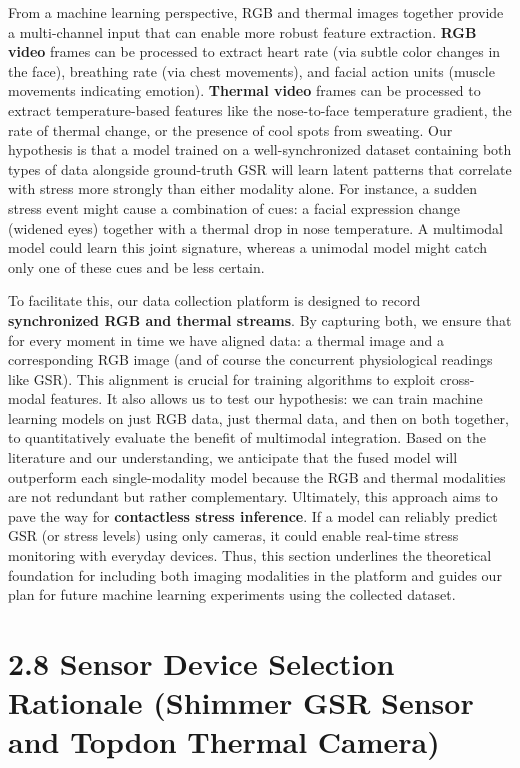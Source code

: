 \documentclass[11pt,a4paper]{report}
\begin{document}
From a machine learning perspective, RGB and thermal images together provide a multi-channel input that can enable more robust feature extraction. \textbf{RGB video} frames can be processed to extract heart rate (via subtle color changes in the face), breathing rate (via chest movements), and facial action units (muscle movements indicating emotion). \textbf{Thermal video} frames can be processed to extract temperature-based features like the nose-to-face temperature gradient, the rate of thermal change, or the presence of cool spots from sweating. Our hypothesis is that a model trained on a well-synchronized dataset containing both types of data alongside ground-truth GSR will learn latent patterns that correlate with stress more strongly than either modality alone. For instance, a sudden stress event might cause a combination of cues: a facial expression change (widened eyes) together with a thermal drop in nose temperature. A multimodal model could learn this joint signature, whereas a unimodal model might catch only one of these cues and be less certain.

To facilitate this, our data collection platform is designed to record \textbf{synchronized RGB and thermal streams}. By capturing both, we ensure that for every moment in time we have aligned data: a thermal image and a corresponding RGB image (and of course the concurrent physiological readings like GSR). This alignment is crucial for training algorithms to exploit cross-modal features. It also allows us to test our hypothesis: we can train machine learning models on just RGB data, just thermal data, and then on both together, to quantitatively evaluate the benefit of multimodal integration. Based on the literature and our understanding, we anticipate that the fused model will outperform each single-modality model because the RGB and thermal modalities are not redundant but rather complementary. Ultimately, this approach aims to pave the way for \textbf{contactless stress inference}. If a model can reliably predict GSR (or stress levels) using only cameras, it could enable real-time stress monitoring with everyday devices. Thus, this section underlines the theoretical foundation for including both imaging modalities in the platform and guides our plan for future machine learning experiments using the collected dataset.

\section{2.8 Sensor Device Selection Rationale (Shimmer GSR Sensor and Topdon Thermal Camera)}
\end{document}
